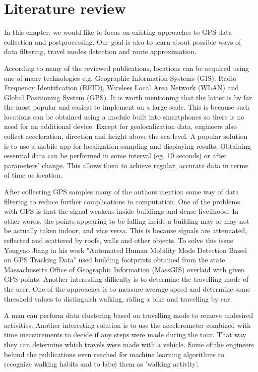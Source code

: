 \chapter{Literature review}

In this chapter, we would like to focus on existing approaches to GPS data collection and postprocessing. Our goal is also to learn about possible ways of data filtering, travel modes detection and route approximation.

According to many of the reviewed publications, locations can be acquired using one of many technologies e.g. Geographic Information Systems (GIS), Radio Frequency Identification (RFID), Wireless Local Area Network (WLAN) and Global Positioning System (GPS). It is worth mentioning that the latter is by far the most popular and easiest to implement on a large scale. This is because such locations can be obtained using a module built into smartphones so there is no need for an additional device. Except for geolocalization data, engineers also collect acceleration, direction and height above the sea level. A popular solution is to use a mobile app for localization sampling and displaying results. Obtaining essential data can be performed in some interval (eg. 10 seconds) or after parameters' change. This allows them to achieve regular, accurate data in terms of time or location.

After collecting GPS samples many of the authors mention some way of data filtering to reduce further complications in computation. One of the problems with GPS is that the signal weakens inside buildings and dense livelihood. In other words, the points appearing to be falling inside a building may or may not be actually taken indoor, and vice versa. This is because signals are attenuated, reflected and scattered by roofs, walls and other objects. To solve this issue Yongyao Jiang in his work "Automated Human Mobility Mode Detection Based on GPS Tracking Data" used building footprints obtained from the state Massachusetts Office of Geographic Information (MassGIS) overlaid with given GPS points.  Another interesting difficulty is to determine the travelling mode of the user. One of the approaches is to measure average speed and determine some threshold values to distinguish walking, riding a bike and travelling by car.

A man can perform data clustering based on travelling mode to remove undesired activities.  Another interesting solution is to use the accelerometer combined with time measurements to decide if any steps were made during the tour. That way they can determine which travels were made with a vehicle. Some of the engineers behind the publications even reached for machine learning algorithms to recognize walking habits and to label them as 'walking activity'.

